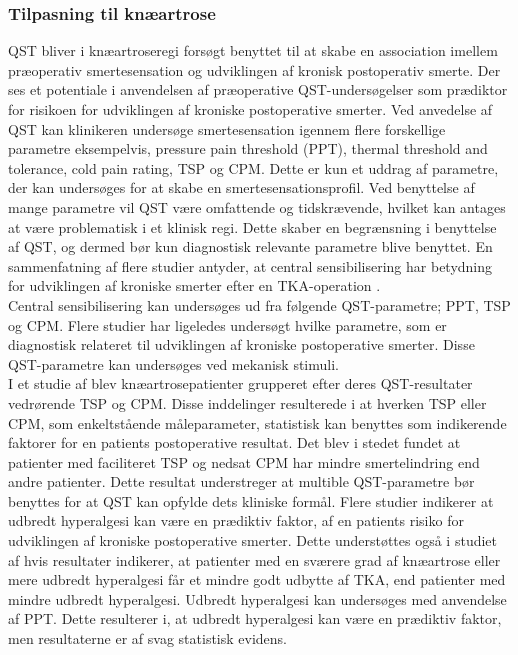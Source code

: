 \subsubsection{Tilpasning til knæartrose}
QST bliver i knæartroseregi forsøgt benyttet til at skabe en association imellem præoperativ smertesensation og udviklingen af kronisk postoperativ smerte. Der ses et potentiale i anvendelsen af præoperative QST-undersøgelser som prædiktor for risikoen for udviklingen af kroniske postoperative smerter. \citep{Wylde2013} Ved anvedelse af QST kan klinikeren undersøge smertesensation igennem flere forskellige parametre eksempelvis, pressure pain threshold (PPT), thermal threshold and tolerance, cold pain rating, TSP og CPM. \citep{Cornelius2015} Dette er kun et uddrag af parametre, der kan undersøges for at skabe en smertesensationsprofil. Ved benyttelse af mange parametre vil QST være omfattende og tidskrævende, hvilket kan antages at være problematisk i et klinisk regi. Dette skaber en begrænsning i benyttelse af QST, og dermed bør kun diagnostisk relevante parametre blive benyttet. \citep{Nielsen2009} En sammenfatning af flere studier antyder, at central sensibilisering har betydning for udviklingen af kroniske smerter efter en TKA-operation \citep{Suokas2012}.\\
Central sensibilisering kan undersøges ud fra følgende QST-parametre; PPT, TSP og CPM. \citep{Arendt-Nielsen2015b} Flere studier har ligeledes undersøgt hvilke parametre, som er diagnostisk relateret til udviklingen af kroniske postoperative smerter. Disse QST-parametre kan undersøges ved mekanisk stimuli. \citep{Petersen2015} \citep{Petersen2016} \citep{Wylde2015b} \\
I et studie af  blev knæartrosepatienter grupperet efter deres QST-resultater vedrørende TSP og CPM. Disse inddelinger resulterede i at hverken TSP eller CPM, som enkeltstående måleparameter, statistisk kan benyttes som indikerende faktorer for en patients postoperative resultat. Det blev i stedet fundet at patienter med faciliteret TSP og nedsat CPM har mindre smertelindring end andre patienter. Dette resultat understreger at multible QST-parametre bør benyttes for at QST kan opfylde dets kliniske formål. \citep{Petersen2016} Flere studier indikerer at udbredt hyperalgesi kan være en prædiktiv faktor, af en patients risiko for udviklingen af kroniske postoperative smerter. \citep{Petersen2016} \citep{Wylde2013} Dette understøttes også i studiet af  hvis resultater indikerer, at patienter med en sværere grad af knæartrose eller mere udbredt hyperalgesi får et mindre godt udbytte af TKA, end patienter med mindre udbredt hyperalgesi. Udbredt hyperalgesi kan undersøges med anvendelse af PPT. Dette resulterer i, at udbredt hyperalgesi kan være en prædiktiv faktor, men resultaterne er af svag statistisk evidens. \citep{Wylde2016c}

